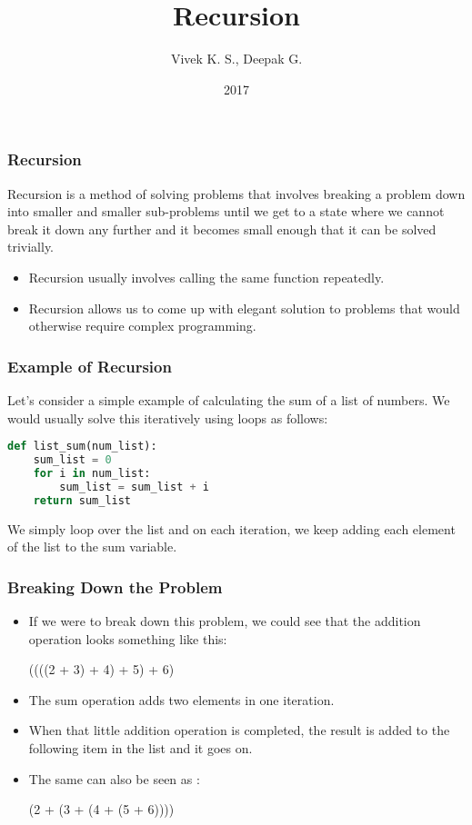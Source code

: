 \documentclass{beamer}
\title{Recursion}
\author{Vivek K. S., Deepak G.}
\institute{Information Systems Decision Sciences (ISDS)\\
MUMA College of Business\\
University of South Florida \\
Tampa, Florida}
\date{2017}
\begin{document}
\frame{\titlepage}

\begin{frame}
\frametitle{Recursion}
Recursion is a method of solving problems that involves breaking a problem down into smaller
and smaller sub-problems until we get to a state where we cannot break it down any further and it becomes small enough that it can be solved trivially.
\begin{itemize}
\item Recursion usually involves calling the same function repeatedly.
\item Recursion allows us to come up with elegant solution to problems that would otherwise require complex programming.
\end{itemize}
\end{frame}

\begin{frame}[fragile]
\frametitle{Example of Recursion}
Let's consider a simple example of calculating the sum of a list of numbers. We would usually solve this iteratively using loops as follows:
\begin{lstlisting}[language=Python]
def list_sum(num_list):
    sum_list = 0
    for i in num_list:
        sum_list = sum_list + i
    return sum_list
\end{lstlisting}
We simply loop over the list and on each iteration, we keep adding each element of the list to the sum variable.
\end{frame}

\begin{frame}[fragile]
\frametitle{Breaking Down the Problem}

\begin{itemize}
\item If we were to break down this problem, we could see that the addition operation looks something like this:

((((2 + 3) + 4) + 5) + 6)
\item The sum operation adds two elements in one iteration.
\item When that little addition operation is completed, the result is added to the following item in the list and it goes on.
\item The same can also be seen as :

(2 + (3 + (4 + (5 + 6))))
\end{itemize}
\end{frame}
\end{document}

